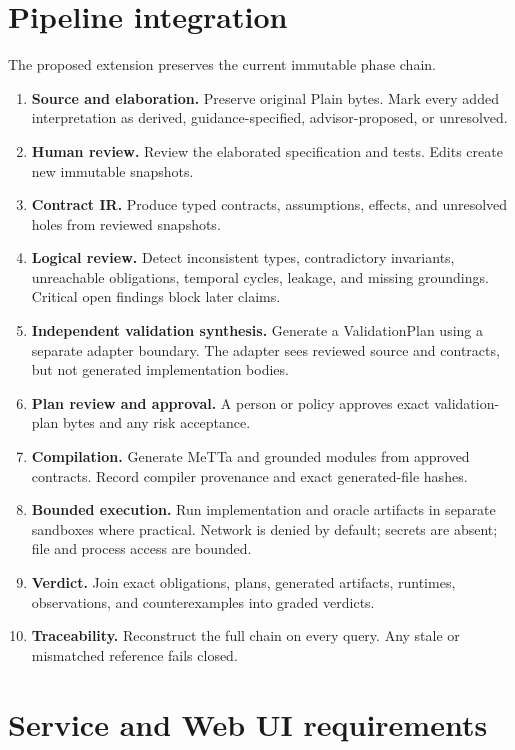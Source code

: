 \documentclass[10pt]{article}
\begin{document}
\section{Pipeline integration}

The proposed extension preserves the current immutable phase chain.

\begin{enumerate}
\item \textbf{Source and elaboration.} Preserve original Plain bytes.  Mark
every added interpretation as derived, guidance-specified, advisor-proposed,
or unresolved.
\item \textbf{Human review.} Review the elaborated specification and tests.
Edits create new immutable snapshots.
\item \textbf{Contract IR.} Produce typed contracts, assumptions, effects,
and unresolved holes from reviewed snapshots.
\item \textbf{Logical review.} Detect inconsistent types, contradictory
invariants, unreachable obligations, temporal cycles, leakage, and missing
groundings.  Critical open findings block later claims.
\item \textbf{Independent validation synthesis.} Generate a ValidationPlan
using a separate adapter boundary.  The adapter sees reviewed source and
contracts, but not generated implementation bodies.
\item \textbf{Plan review and approval.} A person or policy approves exact
validation-plan bytes and any risk acceptance.
\item \textbf{Compilation.} Generate MeTTa and grounded modules from approved
contracts.  Record compiler provenance and exact generated-file hashes.
\item \textbf{Bounded execution.} Run implementation and oracle artifacts in
separate sandboxes where practical.  Network is denied by default; secrets are
absent; file and process access are bounded.
\item \textbf{Verdict.} Join exact obligations, plans, generated artifacts,
runtimes, observations, and counterexamples into graded verdicts.
\item \textbf{Traceability.} Reconstruct the full chain on every query.  Any
stale or mismatched reference fails closed.
\end{enumerate}

\section{Service and Web UI requirements}
\end{document}
